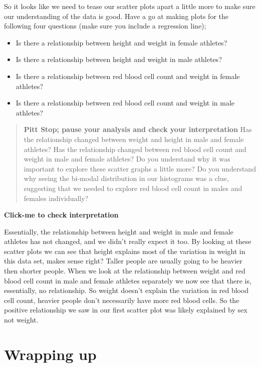 \documentclass[
]{book}
\providecommand{\tightlist}{%
  \setlength{\itemsep}{0pt}\setlength{\parskip}{0pt}}
\begin{document}
So it looks like we need to tease our scatter plots apart a little more to make sure our understanding of the data is good. Have a go at making plots for the following four questions (make sure you include a regression line);

\begin{itemize}
\tightlist
\item
  Is there a relationship between height and weight in female athletes?
\item
  Is there a relationship between height and weight in male athletes?
\item
  Is there a relationship between red blood cell count and weight in female athletes?
\item
  Is there a relationship between red blood cell count and weight in male athletes?
\end{itemize}

\begin{quote}
\textbf{Pitt Stop; pause your analysis and check your interpretation}
Has the relationship changed between weight and height in male and female athletes? Has the relationship changed between red blood cell count and weight in male and female athletes? Do you understand why it was important to explore these scatter graphs a little more? Do you understand why seeing the bi-modal distribution in our histograms was a clue, suggesting that we needed to explore red blood cell count in males and females individually?
\end{quote}

\textbf{Click-me to check interpretation}

Essentially, the relationship between height and weight in male and female athletes has not changed, and we didn't really expect it too. By looking at these scatter plots we can see that height explains most of the variation in weight in this data set, makes sense right? Taller people are usually going to be heavier then shorter people. When we look at the relationship between weight and red blood cell count in male and female athletes separately we now see that there is, essentially, no relationship. So weight doesn't explain the variation in red blood cell count, heavier people don't necessarily have more red blood cells. So the positive relationship we saw in our first scatter plot was likely explained by sex not weight.

\hypertarget{wrapping-up}{%
\section{Wrapping up}\label{wrapping-up}}
\end{document}

